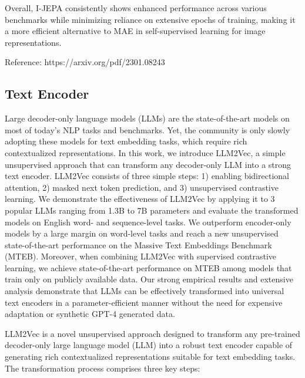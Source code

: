 \documentclass{article} %
\begin{document}
Overall, I-JEPA consistently shows enhanced performance across various benchmarks while minimizing reliance on extensive epochs of training, making it a more efficient alternative to MAE in self-supervised learning for image representations.

Reference: https://arxiv.org/pdf/2301.08243

\subsection{Text Encoder}
Large decoder-only language models (LLMs) are the state-of-the-art models on most of today’s NLP tasks and benchmarks. Yet, the community is only slowly adopting these models for text embedding tasks, which require rich contextualized representations. In this work, we introduce LLM2Vec, a simple unsupervised approach that can transform any decoder-only LLM into a strong text encoder. LLM2Vec consists of three simple steps: 1) enabling bidirectional attention, 2) masked next token prediction, and 3) unsupervised contrastive learning. We demonstrate the effectiveness of LLM2Vec by applying it to 3 popular LLMs ranging from 1.3B to 7B parameters and evaluate the transformed models on English word- and sequence-level tasks. We outperform encoder-only models by a large margin on word-level tasks and reach a new unsupervised state-of-the-art performance on the Massive Text Embeddings Benchmark (MTEB). Moreover, when combining LLM2Vec with supervised contrastive learning, we achieve state-of-the-art performance on MTEB among models that train only on publicly available data. Our strong empirical results and extensive analysis demonstrate that LLMs can be effectively transformed into universal text encoders in a parameter-efficient manner without the need for expensive adaptation or synthetic GPT-4 generated data.

LLM2Vec is a novel unsupervised approach designed to transform any pre-trained decoder-only large language model (LLM) into a robust text encoder capable of generating rich contextualized representations suitable for text embedding tasks. The transformation process comprises three key steps:
\end{document}

